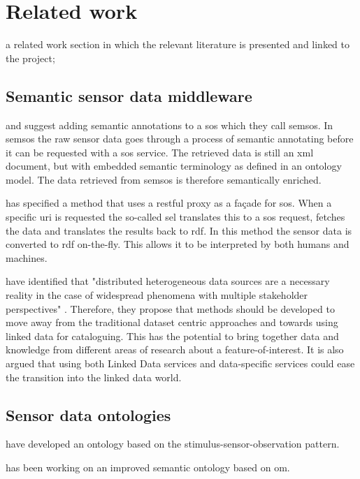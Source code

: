 \chapter{Related work}
\label{chap:rw}

a related work section in which the relevant literature is presented and linked to the project;
\section{Semantic sensor data middleware}
\cite{SSW:Henson} and \cite{SSW:Pschorr} suggest adding semantic annotations to a \ac{sos} which they call \ac{semsos}. In \ac{semsos} the raw sensor data goes through a process of semantic annotating before it can be requested with a \ac{sos} service. The retrieved data is still an \ac{xml} document, but with embedded semantic terminology as defined in an ontology model. The data retrieved from \ac{semsos} is therefore semantically enriched.  

\cite{SSW:Janowicz} has specified a method that uses a \ac{rest}ful proxy as a fa\c{c}ade for \ac{sos}. When a specific \ac{uri} is requested the so-called \ac{sel} translates this to a \ac{sos} request, fetches the data and translates the results back to \ac{rdf}. In this method the sensor data is converted to \ac{rdf} on-the-fly. This allows it to be interpreted by both humans and machines.  

\cite{SSW:Atkinson} have identified that "distributed heterogeneous data sources are a necessary reality in the case of widespread
phenomena with multiple stakeholder perspectives" \cite[p.129]{SSW:Atkinson}. Therefore, they propose that methods should be developed to move away from the traditional dataset centric approaches and towards using linked data for cataloguing. This has the potential to bring together data and knowledge from different areas of research about a feature-of-interest. It is also argued that using both Linked Data services and data-specific services could ease the transition into the linked data world.  

\section{Sensor data ontologies}
\cite{SSW:SSN_incubatorGroup} have developed an ontology based on the stimulus-sensor-observation pattern.

\cite{SSW:Cox3} has been working on an improved semantic ontology based on \ac{om}.

